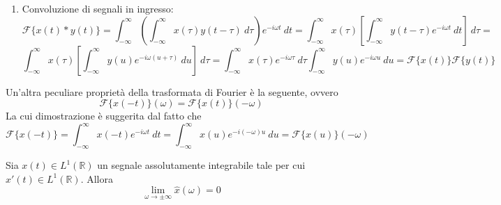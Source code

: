 \begin{enumerate}
        \item Convoluzione di segnali in ingresso:
        \[
            \mathcal{F}\{x(t) * y(t)\} = \int_{-\infty}^{\infty} \left(\int_{-\infty}^{\infty} x(\tau) y(t - \tau) \: d\tau\right) e^{-i \omega t} \: dt = \int_{-\infty}^{\infty} x(\tau) \left[\int_{-\infty}^{\infty} y(t - \tau) e^{-i \omega t} \: dt\right] \: d\tau =
        \]
        \[
            \int_{-\infty}^{\infty} x(\tau) \left[\int_{-\infty}^{\infty} y(u) e^{-i \omega (u + \tau)} \: du\right] \: d\tau = \int_{-\infty}^{\infty} x(\tau) e^{-i \omega \tau} \: d\tau \int_{-\infty}^{\infty} y(u) e^{-i \omega u} \: du = \mathcal{F}\{x(t)\} \mathcal{F}\{y(t)\}
        \]
    \end{enumerate}

    Un'altra peculiare proprietà della trasformata di Fourier è la seguente, ovvero
    \[
        \mathcal{F}\{x(-t)\}(\omega) = \mathcal{F}\{x(t)\}(-\omega)
    \]
    La cui dimostrazione è suggerita dal fatto che
    \[
        \mathcal{F}\{x(-t)\} = \int_{-\infty}^{\infty} x(-t) e^{-i \omega t} \: dt = \int_{-\infty}^{\infty} x(u) e^{-i (-\omega) u} \: du = \mathcal{F}\{x(u)\}(-\omega)
    \]

    \begin{lemma}
        Sia $x(t) \in L^{1}(\mathbb{R})$ un segnale assolutamente integrabile tale per cui $x'(t) \in L^{1}(\mathbb{R})$.
        Allora
        \[
            \lim_{\omega \rightarrow \pm \infty} \hat{x}(\omega) = 0
        \]
    \end{lemma}

